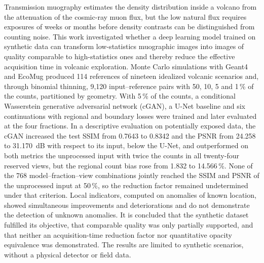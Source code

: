 Transmission muography estimates the density distribution inside a volcano from the attenuation of the cosmic-ray muon flux, but the low natural flux requires exposures of weeks or months before density contrasts can be distinguished from counting noise. This work investigated whether a deep learning model trained on synthetic data can transform low-statistics muographic images into images of quality comparable to high-statistics ones and thereby reduce the effective acquisition time in volcanic exploration. Monte Carlo simulations with Geant4 and EcoMug produced 114 references of nineteen idealized volcanic scenarios and, through binomial thinning, 9,120 input--reference pairs with 50, 10, 5 and 1\,\% of the counts, partitioned by geometry. With 5\,\% of the counts, a conditional Wasserstein generative adversarial network (cGAN), a U-Net baseline and six continuations with regional and boundary losses were trained and later evaluated at the four fractions. In a descriptive evaluation on potentially exposed data, the cGAN increased the test SSIM from 0.7643 to 0.8342 and the PSNR from 24.258 to 31.170~dB with respect to its input, below the U-Net, and outperformed on both metrics the unprocessed input with twice the counts in all twenty-four reserved views, but the regional count bias rose from 1.832 to 14.566\,\%. None of the 768 model--fraction--view combinations jointly reached the SSIM and PSNR of the unprocessed input at 50\,\%, so the reduction factor remained undetermined under that criterion. Local indicators, computed on anomalies of known location, showed simultaneous improvements and deteriorations and do not demonstrate the detection of unknown anomalies. It is concluded that the synthetic dataset fulfilled its objective, that comparable quality was only partially supported, and that neither an acquisition-time reduction factor nor quantitative opacity equivalence was demonstrated. The results are limited to synthetic scenarios, without a physical detector or field data.

\endgroup

